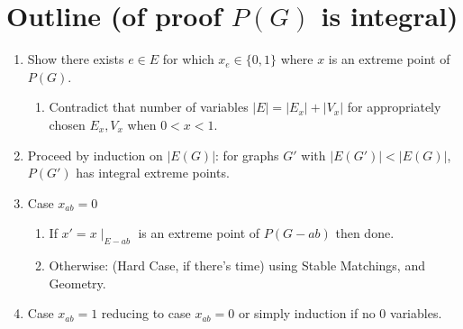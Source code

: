 \documentclass[letterpaper,12pt,oneside,onecolumn]{article}
\begin{document}
\section*{Outline (of proof $P(G)$ is integral)}
\begin{enumerate}
\item Show there exists $e \in E$ for which $x_e \in \{0,1\}$ where $x$ is an extreme point of $P(G)$.
\begin{enumerate}
\item Contradict that number of variables $|E| = |E_x| + |V_x|$ for appropriately chosen $E_x,V_x$ when $0 < x < 1$.
\end{enumerate}
\item Proceed by induction on $|E(G)|$: for graphs $G'$ with $|E(G')| < |E(G)|$, $P(G')$ has integral extreme points.
\item Case $x_{ab} = 0$
\begin{enumerate}
\item If $x' = x\mid_{E-ab}$ is an extreme point of $P(G-ab)$ then done. 
\item Otherwise: (Hard Case, if there's time) using Stable Matchings, and Geometry.
 \end{enumerate}
\item Case $x_{ab} = 1$ reducing to case $x_{ab} = 0$ or simply induction if no $0$ variables.
\end{enumerate}
\end{document}
